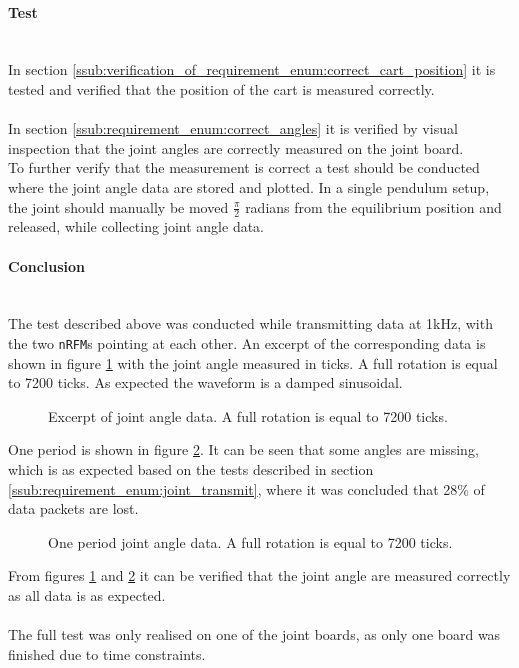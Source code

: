 \paragraph{Test}~\\
In section \ref{ssub:verification_of_requirement_enum:correct_cart_position} it is tested and verified that the position of the cart is measured correctly. 
\\~\\
In section \ref{ssub:requirement_enum:correct_angles} it is verified by visual inspection that the joint angles are correctly measured on the joint board.
\\
To further verify that the measurement is correct a test should be conducted where the joint angle data are stored and plotted.  
In a single pendulum setup, the joint should manually be moved $\frac{\pi}{2}$ radians from the equilibrium position and released, while collecting joint angle data.

\paragraph{Conclusion}~\\
The test described above was conducted while transmitting data at 1kHz, with the two \texttt{nRFM}s pointing at each other.
An excerpt of the corresponding data is shown in figure \ref{fig:joint_angle_measured_full} with the joint angle measured in ticks.
A full rotation is equal to 7200 ticks.
As expected the waveform is a damped sinusoidal.
\begin{figure}[h]
	\centering
	\caption[Excerpt of joint angle data]{Excerpt of joint angle data. A full rotation is equal to 7200 ticks.}
	\label{fig:joint_angle_measured_full}
\end{figure}
One period is shown in figure \ref{fig:joint_angle_measured_zoom}.
It can be seen that some angles are missing, which is as expected based on the tests described in section \ref{ssub:requirement_enum:joint_transmit}, where it was concluded that 28\% of data packets are lost.
\begin{figure}[h]
	\centering
	\caption[One period joint angle data]{One period joint angle data. A full rotation is equal to 7200 ticks.}
	\label{fig:joint_angle_measured_zoom}
\end{figure}
From figures \ref{fig:joint_angle_measured_full} and \ref{fig:joint_angle_measured_zoom} it can be verified that the joint angle are measured correctly as all data is as expected.
\\~\\
The full test was only realised on one of the joint boards, as only one board was finished due to time constraints.


